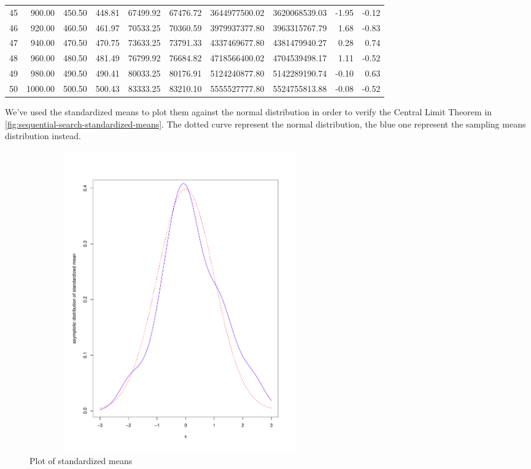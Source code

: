 \documentclass[twoside,openright,titlepage,fleqn,
	headinclude,11pt,a4paper,BCOR5mm,footinclude
	]{scrbook}
\begin{document}
\begin{table}[ht]
\begin{center}
{\begin{tabular}{rrrrrrrrrr}
        45 & 900.00 & 450.50 & 448.81 & 67499.92 & 67476.72 & 3644977500.02 & 3620068539.03 & -1.95 & -0.12 \\ 
        46 & 920.00 & 460.50 & 461.97 & 70533.25 & 70360.59 & 3979937377.80 & 3963315767.79 & 1.68 & -0.83 \\ 
        47 & 940.00 & 470.50 & 470.75 & 73633.25 & 73791.33 & 4337469677.80 & 4381479940.27 & 0.28 & 0.74 \\ 
        48 & 960.00 & 480.50 & 481.49 & 76799.92 & 76684.82 & 4718566400.02 & 4704539498.17 & 1.11 & -0.52 \\ 
        49 & 980.00 & 490.50 & 490.41 & 80033.25 & 80176.91 & 5124240877.80 & 5142289190.74 & -0.10 & 0.63 \\ 
        50 & 1000.00 & 500.50 & 500.43 & 83333.25 & 83210.10 & 5555527777.80 & 5524755813.88 & -0.08 & -0.52 \\ 
        \hline
      \end{tabular}
    }
  \end{center}
\end{table}

We've used the standardized means to plot them against the normal
distribution in order to verify the Central Limit Theorem in
\autoref{fig:sequential-search-standardized-means}. The dotted curve
represent the normal distribution, the blue one represent the sampling
means distribution instead.
\begin{figure}[htb]
\centering
\includegraphics[height=13cm,width=13cm]{pictures/sequential-search-asymtotic-behaviour-of-standardized-means.pdf}
\caption{Plot of standardized means}
\label{fig:sequential-search-standardized-means}
\end{figure}
\end{document}
